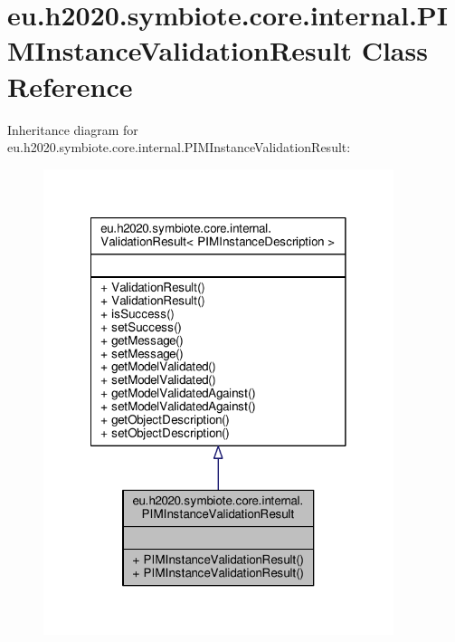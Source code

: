 \hypertarget{classeu_1_1h2020_1_1symbiote_1_1core_1_1internal_1_1PIMInstanceValidationResult}{}\section{eu.\+h2020.\+symbiote.\+core.\+internal.\+P\+I\+M\+Instance\+Validation\+Result Class Reference}
\label{classeu_1_1h2020_1_1symbiote_1_1core_1_1internal_1_1PIMInstanceValidationResult}


Inheritance diagram for eu.\+h2020.\+symbiote.\+core.\+internal.\+P\+I\+M\+Instance\+Validation\+Result\+:
\nopagebreak
\begin{figure}[H]
\begin{center}
\leavevmode
\includegraphics[width=290pt]{classeu_1_1h2020_1_1symbiote_1_1core_1_1internal_1_1PIMInstanceValidationResult__inherit__graph}
\end{center}
\end{figure}


